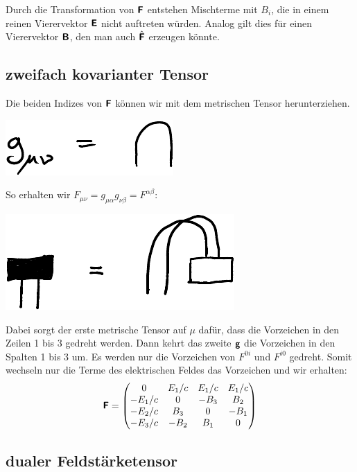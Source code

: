 Durch die Transformation von $\boldsymbol{\mathsf{F}}$ entstehen Mischterme mit $B_i$, die in
einem reinen Vierervektor $\boldsymbol{\mathsf{E}}$ nicht auftreten würden. Analog gilt dies
für einen Vierervektor $\boldsymbol{\mathsf{B}}$, den man auch $\hat{\boldsymbol{\mathsf{F}}}$ erzeugen könnte.

\subsection{zweifach kovarianter Tensor}

Die beiden Indizes von $\boldsymbol{\mathsf{F}}$ können wir mit dem metrischen Tensor
herunterziehen.
\begin{center}
	\includegraphics{H1-Penrose-5-crop.pdf}
\end{center}

So erhalten wir $F_{\mu\nu} = g_{\mu\alpha} g_{\nu\beta} = F^{\alpha\beta}$:
\begin{center}
	\includegraphics{H1-Penrose-10-crop.pdf}
\end{center}

Dabei sorgt der erste metrische Tensor auf $\mu$ dafür, dass die Vorzeichen in
den Zeilen 1 bis 3 gedreht werden. Dann kehrt das zweite $\boldsymbol{\mathsf{g}}$ die
Vorzeichen in den Spalten 1 bis 3 um. Es werden nur die Vorzeichen
von $F^{0i}$ und $F^{i0}$ gedreht. Somit wechseln nur die Terme des
elektrischen Feldes das Vorzeichen und wir erhalten:
\[
	\boldsymbol{\mathsf{F}}
	=
	\begin{pmatrix}
		0 & E_1/c & E_1/c & E_1/c \\
		-E_1/c & 0 & -B_3 & B_2 \\
		-E_2/c & B_3 & 0 & -B_1 \\
		-E_3/c & -B_2 & B_1 & 0 \\
	\end{pmatrix}
\]

\subsection{dualer Feldstärketensor}


